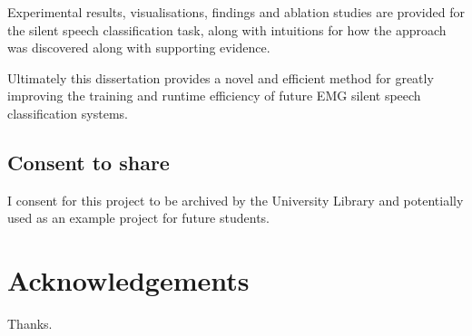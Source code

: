 \documentclass[12pt, a4paper]{report}
\begin{document}
Experimental results, visualisations, findings and ablation studies are provided
for the silent speech classification task, along with intuitions for how the
approach was discovered along with supporting evidence.

Ultimately this dissertation provides a novel and efficient method for greatly
improving the training and runtime efficiency of future EMG silent speech
classification systems.

\vspace{10mm}
\section*{Consent to share}
I consent for this project to be archived by the University Library and potentially used as an example project for future students.

\newpage
\renewcommand{\contentsname}{Table of Contents}	%
\tableofcontents

\newpage
{}	%
\listoftables

\newpage
{}	%
\listoffigures


\newpage

{}
\chapter*{Acknowledgements}
Thanks.
\newpage












\newpage
{}
{}
\printbibliography
\end{document}

